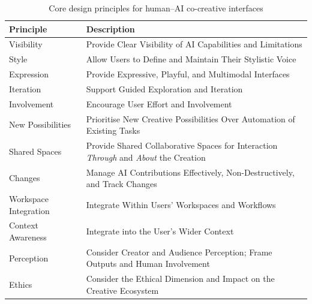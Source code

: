 \begin{table}[ht]
  \centering
  \begin{tabularx}{0.95\textwidth}{>{\centering\arraybackslash}p{} X}
    \rowcolor{blue!20}
    \textbf{Principle} & \textbf{Description} \\ \midrule
    Visibility & Provide Clear Visibility of AI Capabilities and Limitations \\
    Style & Allow Users to Define and Maintain Their Stylistic Voice \\
    Expression & Provide Expressive, Playful, and Multimodal Interfaces \\
    Iteration & Support Guided Exploration and Iteration \\
    Involvement & Encourage User Effort and Involvement \\
    New Possibilities & Prioritise New Creative Possibilities Over Automation of Existing Tasks \\
    Shared Spaces & Provide Shared Collaborative Spaces for Interaction \emph{Through} and \emph{About} the Creation \\
    Changes & Manage AI Contributions Effectively, Non-Destructively, and Track Changes \\
    Workspace Integration & Integrate Within Users’ Workspaces and Workflows \\
    Context Awareness & Integrate into the User’s Wider Context \\
    Perception & Consider Creator and Audience Perception; Frame Outputs and Human Involvement \\
    Ethics & Consider the Ethical Dimension and Impact on the Creative Ecosystem \\ \bottomrule
  \end{tabularx}
  \caption{Core design principles for human–AI co-creative interfaces}
  \label{tab:co_creative_principles}
\end{table}





